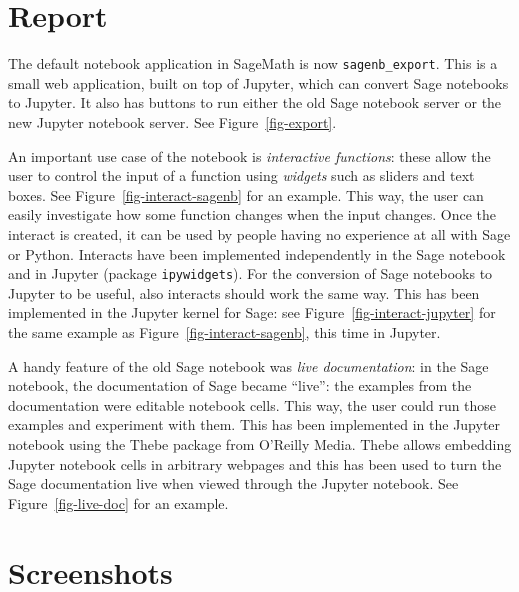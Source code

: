 \documentclass{deliverablereport}
\author{Florent Cayr\'e, Jeroen Demeyer, Nicolas M. Thi\'ery}
\begin{document}
\maketitle
\githubissuedescription
\tableofcontents

\section{Report}
The default notebook application in SageMath is now \texttt{sagenb\_export}.
This is a small web application, built on top of Jupyter,
which can convert Sage notebooks to Jupyter.
It also has buttons to run either the
old Sage notebook server or the new Jupyter notebook server.
See Figure~\ref{fig-export}.

An important use case of the notebook is \emph{interactive functions}:
these allow the user to control the input of a function
using \emph{widgets} such as sliders and text boxes.
See Figure~\ref{fig-interact-sagenb} for an example.
This way, the user can easily investigate how some function changes
when the input changes.
Once the interact is created, it can be used by people having no experience
at all with Sage or Python.
Interacts have been implemented independently in the Sage notebook
and in Jupyter (package \texttt{ipywidgets}).
For the conversion of Sage notebooks to Jupyter to be useful,
also interacts should work the same way.
This has been implemented in the Jupyter kernel for Sage:
see Figure~\ref{fig-interact-jupyter} for the same example as
Figure~\ref{fig-interact-sagenb}, this time in Jupyter.

A handy feature of the old Sage notebook was \emph{live documentation}:
in the Sage notebook, the documentation of Sage became ``live'':
the examples from the documentation were editable notebook cells.
This way, the user could run those examples and experiment with them.
This has been implemented in the Jupyter notebook using
the Thebe package from O'Reilly Media.
Thebe allows embedding Jupyter notebook cells in arbitrary webpages
and this has been used to turn the Sage documentation live when viewed
through the Jupyter notebook.
See Figure~\ref{fig-live-doc} for an example.


\appendix
\section{Screenshots}
\newcommand{\screenshot}[2]{
\begin{figure}[ht]
  \texttt{[image: \#1]}
  \caption{#2}
\end{figure}}
\end{document}
